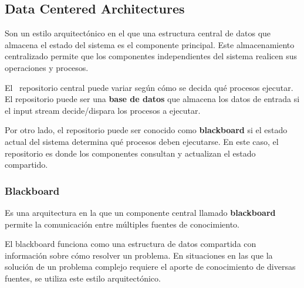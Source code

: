 \documentclass{article}
\begin{document}
		\subsection{Data Centered Architectures}
		Son un estilo arquitectónico en el que una estructura central de datos que almacena el estado del sistema es el componente principal. Este almacenamiento centralizado permite que los componentes independientes del sistema realicen sus operaciones y procesos.
		
		El  repositorio central puede variar según cómo se decida qué procesos ejecutar. El repositorio puede ser una \textbf{base de datos} que almacena los datos de entrada si el input stream decide/dispara los procesos a ejecutar.
		
		 Por otro lado, el repositorio puede ser conocido como \textbf{blackboard} si el estado actual del sistema determina qué procesos deben ejecutarse. En este caso, el repositorio es donde los componentes consultan y actualizan el estado compartido.
			\subsubsection{Blackboard}
			Es una arquitectura en la que un componente central llamado \textbf{blackboard} permite la comunicación entre múltiples fuentes de conocimiento.
				
			El blackboard funciona como una estructura de datos compartida con información sobre cómo resolver un problema. En situaciones en las que la solución de un problema complejo requiere el aporte de conocimiento de diversas fuentes, se utiliza este estilo arquitectónico.
			
\end{document}
